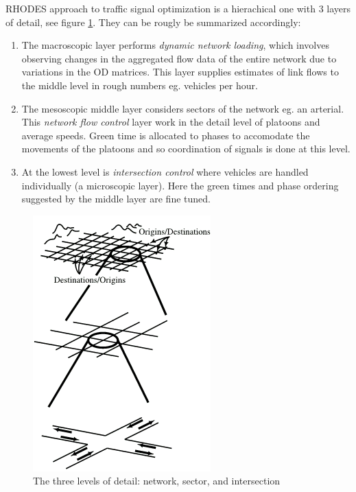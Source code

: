 RHODES approach to traffic signal optimization is a hierachical one with 3 layers of detail, see figure \ref{fig:rhodes_hierarchi}. They can be rougly be summarized accordingly:

\begin{enumerate}
\item The macroscopic layer performs \textit{dynamic network loading}, which involves observing changes in the aggregated flow data of the entire network due to variations in the OD matrices. This layer supplies estimates of link flows to the middle level in rough numbers eg. vehicles per hour.
\item The mesoscopic middle layer considers sectors of the network eg. an arterial. This \textit{network flow control} layer work in the detail level of platoons and average speeds. Green time is allocated to phases to accomodate the movements of the platoons and so coordination of signals is done at this level.
\item At the lowest level is \textit{intersection control} where vehicles are handled individually (a microscopic layer). Here the green times and phase ordering suggested by the middle layer are fine tuned.
\end{enumerate}

\begin{figure}[!ht]
\begin{center}
\includegraphics[scale=0.5]{rhodes_hierachy.png} 
\end{center}
\caption{The three levels of detail: network, sector, and intersection}
\label{fig:rhodes_hierarchi}
\end{figure}

